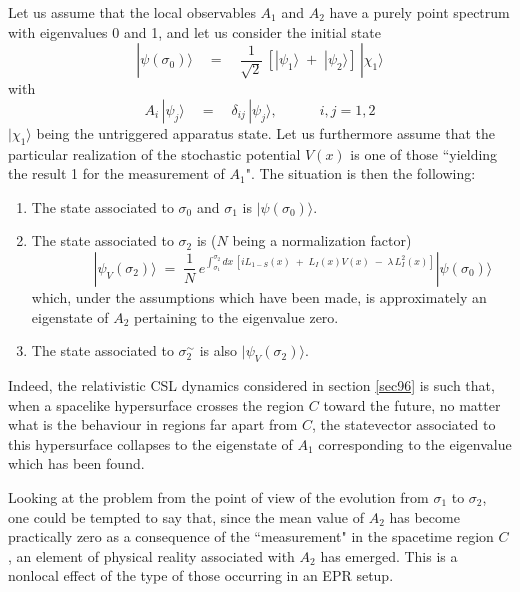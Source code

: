\documentclass[10pt,a4paper]{article}
\begin{document}
Let us assume that the local observables $A_{1}$ and $A_{2}$ have
a purely point spectrum with eigenvalues 0 and 1, and let us
consider the initial state
\begin{equation}
|\psi(\sigma_{0})\rangle \quad = \quad \frac{1}{\sqrt{2}}\, [
|\psi_{1}\rangle \; + \; |\psi_{2}\rangle ]\, |\chi_{1}\rangle
\end{equation}
with
\begin{equation}
A_{i}\, |\psi_{j}\rangle \quad = \quad \delta_{ij}\,
|\psi_{j}\rangle, \qquad\quad i, j = 1, 2
\end{equation}
$|\chi_{1}\rangle$ being the untriggered apparatus state. Let us
furthermore assume that the particular realization of the
stochastic potential $V(x)$ is one of those ``yielding the result
1 for the measurement of $A_{1}$". The situation is then the
following:
\begin{enumerate}
\item The state associated to $\sigma_{0}$ and $\sigma_{1}$ is
$|\psi(\sigma_{0})\rangle$.
\item The state associated to $\sigma_{2}$ is ($N$ being a
normalization factor)
\begin{equation} \qquad\quad
|\psi_{V}(\sigma_{2})\rangle \; = \; \frac{1}{N}\,
e^{\displaystyle \int_{\sigma_{1}}^{\sigma_{2}} dx\, [i L_{1-S}(x)
\; + \; L_{I}(x)V(x)\; - \; \lambda\, L_{I}^{2}(x)]}
|\psi(\sigma_{0})\rangle
\end{equation}
which, under the assumptions which have been made, is
approximately an eigenstate of $A_{2}$ pertaining to the
eigenvalue zero.
\item The state associated to $\sigma_{2}^{\sim}$ is also
$|\psi_{V}(\sigma_{2})\rangle$.
\end{enumerate}
Indeed, the relativistic CSL dynamics considered in section
\ref{sec96} is such that, when a spacelike hypersurface crosses
the region $C$ toward the future, no matter what is the behaviour
in regions far apart from $C$, the statevector associated to this
hypersurface collapses to the eigenstate of $A_{1}$ corresponding
to the eigenvalue which has been found.

Looking at the problem from the point of view of the evolution
from $\sigma_{1}$ to $\sigma_{2}$, one could be tempted to say
that, since the mean value of $A_{2}$ has become practically zero
as a consequence of the ``measurement" in the spacetime region
$C$, an element of physical reality associated with $A_{2}$ has
emerged. This is a nonlocal effect of the type of those occurring
in an EPR setup.
\end{document}
